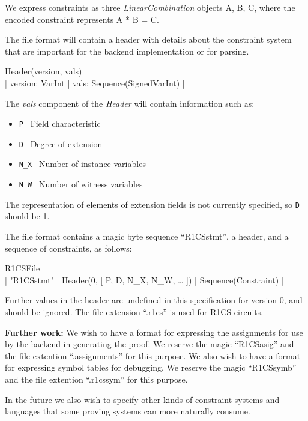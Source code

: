 We express constraints as three \emph{LinearCombination} objects A, B, C, where the encoded constraint represents A * B = C.

The file format will contain a header with details about the constraint system that are important for the backend implementation or for parsing.

{\ttfamily
Header(version, vals) \shortleftarrow\\
| version: VarInt | vals: Sequence(SignedVarInt) |
}

The \emph{vals} component of the \emph{Header} will contain information such as:
\begin{itemize}
  \item  {\tt P} \shortleftarrow\ Field characteristic
  \item  {\tt D} \shortleftarrow\ Degree of extension
  \item  {\tt N\_X} \shortleftarrow\ Number of instance variables
  \item  {\tt N\_W} \shortleftarrow\ Number of witness variables
\end{itemize}

The representation of elements of extension fields is not currently specified, so {\tt D} should be 1.

The file format contains a magic byte sequence  “R1CSstmt”, a header, and a sequence of constraints, as follows:

{\ttfamily
R1CSFile \shortleftarrow\\
| "R1CSstmt" | Header(0, [ P, D, N\_X, N\_W, … ]) | Sequence(Constraint) |
}

Further values in the header are undefined in this specification for version 0, and should be ignored. The file extension “.r1cs” is used for R1CS circuits.

\textbf{Further work:} We wish to have a format for expressing the assignments for use by the backend in generating the proof. We reserve the magic “R1CSasig” and the file extention “.assignments” for this purpose. We also wish to have a format for expressing symbol tables for debugging. We reserve the magic “R1CSsymb” and the file extention “.r1cssym” for this purpose.

In the future we also wish to specify other kinds of constraint systems and languages that some proving systems can more naturally consume.




